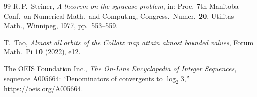 \documentclass[11pt,a4paper]{article}
\theoremstyle{definition}
\theoremstyle{remark}
\begin{document}
\begin{thebibliography}{99}
R.\,P.~Steiner,
\emph{A theorem on the syracuse problem},
in: Proc.\ 7th Manitoba Conf.\ on Numerical Math.\ and Computing,
Congress.\ Numer.\ \textbf{20}, Utilitas Math., Winnipeg, 1977,
pp.\ 553--559.

T.~Tao,
\emph{Almost all orbits of the Collatz map attain almost bounded
values},
Forum Math.\ Pi \textbf{10} (2022), e12.

The OEIS Foundation Inc.,
\emph{The On-Line Encyclopedia of Integer Sequences},
sequence A005664: ``Denominators of convergents to $\log_2 3$,''
\url{https://oeis.org/A005664}.

\end{thebibliography}
\end{document}

